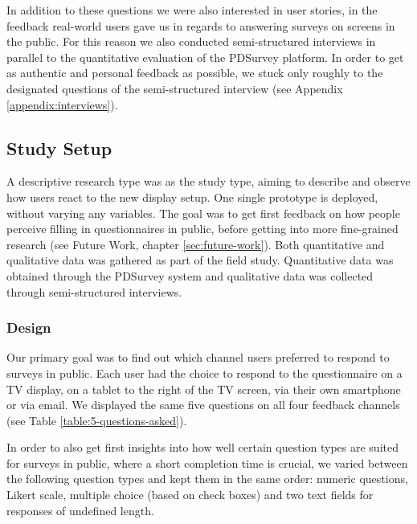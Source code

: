 	In addition to these questions we were also interested in user stories, in the feedback real-world users gave us in regards to answering surveys on screens in the public. For this reason we also conducted semi-structured interviews in parallel to the quantitative evaluation of the PDSurvey platform. In order to get as authentic and personal feedback as possible, we stuck only roughly to the designated questions of the semi-structured interview (see Appendix \ref{appendix:interviews}).




\subsection{Study Setup}

	A descriptive research type was as the study type, aiming to describe and observe how users react to the new display setup. One single prototype is deployed, without varying any variables. The goal was to get first feedback on how people perceive filling in questionnaires in public, before getting into more fine-grained research (see Future Work, chapter \ref{sec:future-work}). 
	Both quantitative and qualitative data was gathered as part of the field study. Quantitative data was obtained through the PDSurvey system and qualitative data was collected through semi-structured interviews.



	\subsubsection{Design}

	Our primary goal was to find out which channel users preferred to respond to surveys in public. Each user had the choice to respond to the questionnaire on a TV display, on a tablet to the right of the TV screen, via their own smartphone or via email. We displayed the same five questions on all four feedback channels (see Table \ref{table:5-questions-asked}).

	


	In order to also get first insights into how well certain question types are suited for surveys in public, where a short completion time is crucial, we varied between the following question types and kept them in the same order: numeric questions, Likert scale, multiple choice (based on check boxes) and two text fields for responses of undefined length. 

